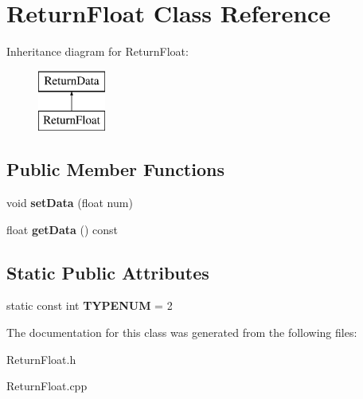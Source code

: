 \hypertarget{class_return_float}{\section{Return\-Float Class Reference}
\label{class_return_float}
}
Inheritance diagram for Return\-Float\-:\begin{figure}[H]
\begin{center}
\leavevmode
\includegraphics[height=2.000000cm]{class_return_float}
\end{center}
\end{figure}
\subsection*{Public Member Functions}
\begin{DoxyCompactItemize}
\item 
\hypertarget{class_return_float_a3d8aea3ea6e416098554dfd157cb60eb}{void {\bfseries set\-Data} (float num)}\label{class_return_float_a3d8aea3ea6e416098554dfd157cb60eb}

\item 
\hypertarget{class_return_float_afa93a257baac8ee3d9812851bf44cbb8}{float {\bfseries get\-Data} () const }\label{class_return_float_afa93a257baac8ee3d9812851bf44cbb8}

\end{DoxyCompactItemize}
\subsection*{Static Public Attributes}
\begin{DoxyCompactItemize}
\item 
\hypertarget{class_return_float_aba14d134e5986c2c8e706a6a6107e867}{static const int {\bfseries T\-Y\-P\-E\-N\-U\-M} = 2}\label{class_return_float_aba14d134e5986c2c8e706a6a6107e867}

\end{DoxyCompactItemize}


The documentation for this class was generated from the following files\-:\begin{DoxyCompactItemize}
\item 
Return\-Float.\-h\item 
Return\-Float.\-cpp\end{DoxyCompactItemize}
